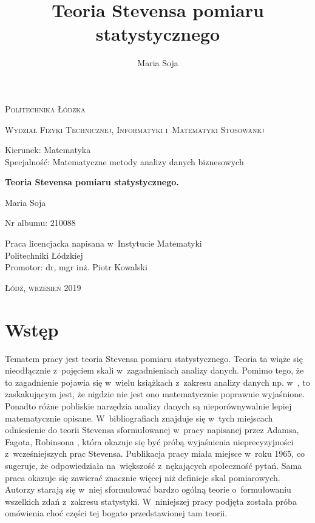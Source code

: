 \documentclass[12pt,a4paper]{report}
\author{Maria Soja}
\title{Teoria Stevensa pomiaru statystycznego}
\begin{document}
\begin{titlepage}
\begin{flushleft}
\end{flushleft}
\begin{center}
\textsc{{\huge Politechnika Łódzka}}
\end{center}
\bigskip
\bigskip
\begin{center}
\textsc{{\Large Wydział Fizyki Technicznej, Informatyki i~Matematyki Stosowanej}}
\end{center}
\bigskip
\bigskip
\begin{Large}
Kierunek: Matematyka 
\\Specjalność: Matematyczne metody analizy danych biznesowych

\end{Large}
\bigskip
\bigskip
\noindent\hrulefill
\begin{center}
{\textbf{{\Large Teoria Stevensa pomiaru statystycznego.}}}
\end{center}
\begin{flushright}
{\large 
Maria Soja

Nr albumu: 
210088
}
\end{flushright}
\noindent\hrulefill
\bigskip
\bigskip
\begin{center}
{\large Praca licencjacka
napisana w~Instytucie Matematyki 
\\Politechniki Łódzkiej 
\bigskip
\bigskip
\\Promotor: dr, mgr inż. Piotr Kowalski
 }
\end{center}
\bigskip
\bigskip
\bigskip
\bigskip
\begin{center}
{\textsc{\large Łódź, wrzesień 2019}}
\end{center}
\end{titlepage}


\tableofcontents

\chapter{Wstęp}

Tematem pracy jest teoria Stevensa pomiaru statystycznego. Teoria ta wiąże się nieodłącznie z~pojęciem skali w~zagadnieniach analizy danych. Pomimo tego, że to zagadnienie pojawia się w~wielu książkach z~zakresu analizy danych np. w~{\citep{walesiak2009statystyczna}}, to zaskakującym jest, że nigdzie nie jest ono matematycznie poprawnie wyjaśnione. Ponadto różne pobliskie narzędzia analizy danych są nieporównywalnie lepiej matematycznie opisane. W~bibliografiach znajduje się w~tych miejscach odniesienie do teorii Stevensa sformułowanej w~pracy napisanej przez Adamsa, Fagota, Robinsona {\citep{adams1965theory}}, która okazuje się być próbą wyjaśnienia nieprecyzyjności z~wcześniejszych prac Stevensa. Publikacja pracy miała miejsce w~roku 1965, co sugeruje, że odpowiedziała na~większość z~nękających społeczność pytań. Sama praca okazuje się zawierać znacznie więcej niż definicje skal pomiarowych. Autorzy starają się w~niej sformułować bardzo ogólną teorie o~formułowaniu wszelkich zdań z~zakresu statystyki. W~niniejszej pracy podjęta została próba omówienia choć części tej bogato przedstawionej tam teorii. 
 
\end{document}
